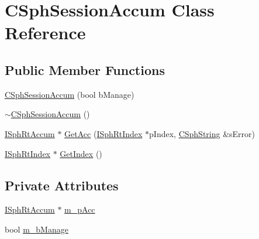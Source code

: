 \hypertarget{classCSphSessionAccum}{\section{C\-Sph\-Session\-Accum Class Reference}
\label{classCSphSessionAccum}
}
\subsection*{Public Member Functions}
\begin{DoxyCompactItemize}
\item 
\hyperlink{classCSphSessionAccum_a30ab09c792697f5af61580d71f50a2e0}{C\-Sph\-Session\-Accum} (bool b\-Manage)
\item 
\hyperlink{classCSphSessionAccum_aa7f12a7c172c9167e6d34f23e4daaa51}{$\sim$\-C\-Sph\-Session\-Accum} ()
\item 
\hyperlink{classISphRtAccum}{I\-Sph\-Rt\-Accum} $\ast$ \hyperlink{classCSphSessionAccum_a240a5b97d997d6623463e847a8d6d4a7}{Get\-Acc} (\hyperlink{classISphRtIndex}{I\-Sph\-Rt\-Index} $\ast$p\-Index, \hyperlink{structCSphString}{C\-Sph\-String} \&s\-Error)
\item 
\hyperlink{classISphRtIndex}{I\-Sph\-Rt\-Index} $\ast$ \hyperlink{classCSphSessionAccum_aee01004ce86b7ec65ae79076c34f557d}{Get\-Index} ()
\end{DoxyCompactItemize}
\subsection*{Private Attributes}
\begin{DoxyCompactItemize}
\item 
\hyperlink{classISphRtAccum}{I\-Sph\-Rt\-Accum} $\ast$ \hyperlink{classCSphSessionAccum_a7558518bb3604825c38a97a071ed1969}{m\-\_\-p\-Acc}
\item 
bool \hyperlink{classCSphSessionAccum_a2b561f1960b2b5610bf61cd65a0f682c}{m\-\_\-b\-Manage}
\end{DoxyCompactItemize}


